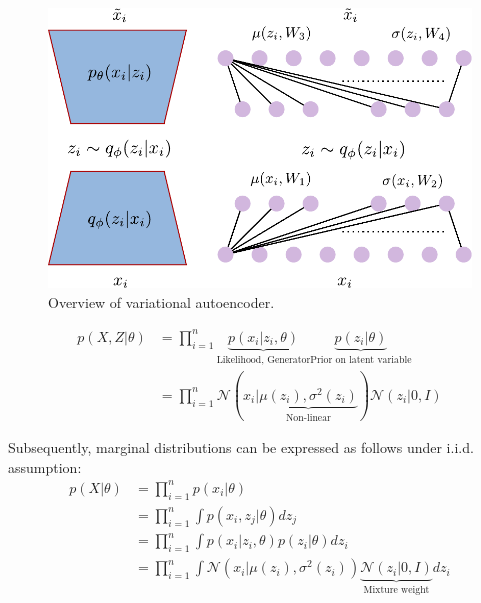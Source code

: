 \begin{figure}[h]
	\begin{center}
		\includegraphics[scale=0.5]{./images/encoder.pdf}
	\end{center}
	\caption{Overview of variational autoencoder.}
	\label{fig:vae}
\end{figure}



\begin{align*}
	p(X,Z|\theta) &=  \prod_{i=1}^{n}\underbrace{p(x_i|z_i,\theta)}_{\textrm{Likelihood, Generator}}\underbrace{p(z_i|\theta)}_{\textrm{Prior on latent variable}}\\
	&= \prod_{i=1}^{n} \mathcal{N}(x_{i}|\underbrace{\mu(z_i), \sigma^2(z_i)}_{\textrm{Non-linear}}) \mathcal{N}(z_i|0, I)
\end{align*}

Subsequently, marginal distributions can be expressed as follows under i.i.d. assumption:
\begin{align*}
	p(X|\theta) &= \prod_{i=1}^{n} p(x_i|\theta) \\
	&= \prod_{i=1}^{n} \int p(x_i, z_j|\theta) dz_j \\
	& = \prod_{i=1}^{n} \int p(x_i|z_i, \theta)p(z_i|\theta)dz_i \\
	& = \prod_{i=1}^{n} \int \mathcal{N}(x_{i}|\mu(z_i), \sigma^2(z_i)) \underbrace{\mathcal{N}(z_i|0, I)}_{\textrm{Mixture weight}} dz_i
\end{align*}


